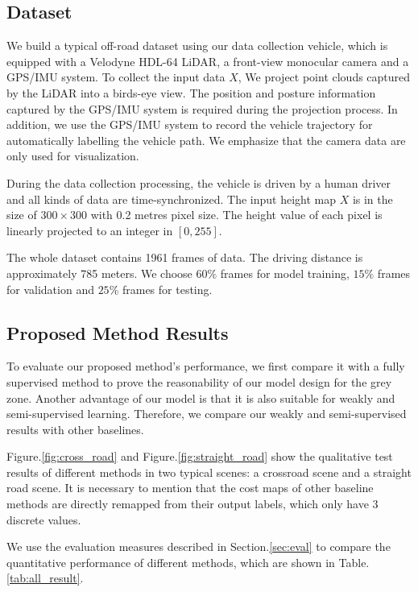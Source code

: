 \documentclass[letterpaper, 10 pt, conference]{ieeeconf}  %
\begin{document}
\subsection{Dataset}
We build a typical off-road dataset using our data collection vehicle, which is equipped with a Velodyne HDL-64 LiDAR, a front-view monocular camera and a GPS/IMU system. To collect the input data $X$, We project point clouds captured by the LiDAR into a birds-eye view. The position and posture information captured by the GPS/IMU system is required during the projection process. In addition, we use the GPS/IMU system to record the vehicle trajectory for automatically labelling the vehicle path. We emphasize that the camera data are only used for visualization.

During the data collection processing, the vehicle is driven by a human driver and all kinds of data are time-synchronized. The input height map $X$ is in the size of $300\times 300$ with 0.2 metres pixel size. The height value of each pixel is linearly projected to an integer in $[0,255]$.

The whole dataset contains 1961 frames of data. The driving distance is approximately 785 meters. We choose $60\%$ frames for model training, $15\%$ frames for validation and $25\%$ frames for testing.

\subsection{Proposed Method Results}
To evaluate our proposed method's performance, we first compare it with a fully supervised method to prove the reasonability of our model design for the grey zone. Another advantage of our model is that it is also suitable for weakly and semi-supervised learning. Therefore, we compare our weakly and semi-supervised results with other baselines.

Figure.\ref{fig:cross_road} and Figure.\ref{fig:straight_road} show the qualitative test results of different methods in two typical scenes: a crossroad scene and a straight road scene. It is necessary to mention that the cost maps of other baseline methods are directly remapped from their output labels, which only have 3 discrete values.

We use the evaluation measures described in Section.\ref{sec:eval} to compare the quantitative performance of different methods, which are shown in Table.\ref{tab:all_result}. 
\end{document}
